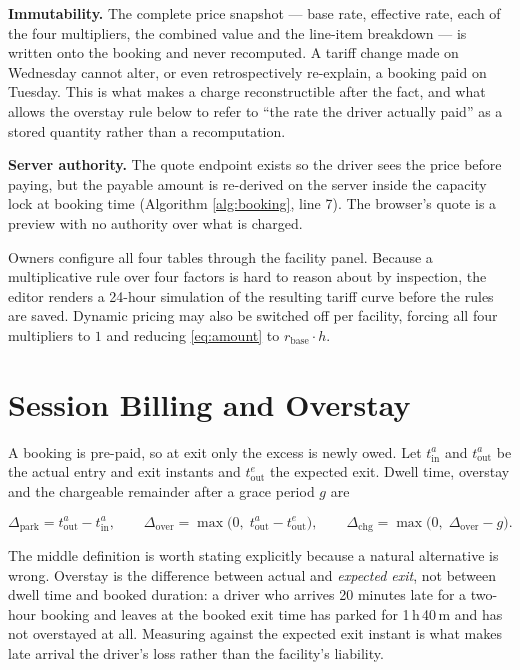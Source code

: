 \documentclass[journal,onecolumn,11pt]{IEEEtran}
\begin{document}
\textbf{Immutability.} The complete price snapshot --- base rate, effective
rate, each of the four multipliers, the combined value and the line-item
breakdown --- is written onto the booking and never recomputed. A tariff change
made on Wednesday cannot alter, or even retrospectively re-explain, a booking
paid on Tuesday. This is what makes a charge reconstructible after the fact,
and what allows the overstay rule below to refer to ``the rate the driver
actually paid'' as a stored quantity rather than a recomputation.

\textbf{Server authority.} The quote endpoint exists so the driver sees the
price before paying, but the payable amount is re-derived on the server inside
the capacity lock at booking time (Algorithm \ref{alg:booking}, line 7). The
browser's quote is a preview with no authority over what is charged.

Owners configure all four tables through the facility panel. Because a
multiplicative rule over four factors is hard to reason about by inspection,
the editor renders a 24-hour simulation of the resulting tariff curve before
the rules are saved. Dynamic pricing may also be switched off per facility,
forcing all four multipliers to $1$ and reducing \eqref{eq:amount} to
$r_{\text{base}} \cdot h$.

\section{Session Billing and Overstay}
\label{sec:billing}

A booking is pre-paid, so at exit only the excess is newly owed. Let
$t_{\text{in}}^{a}$ and $t_{\text{out}}^{a}$ be the actual entry and exit
instants and $t_{\text{out}}^{e}$ the expected exit. Dwell time, overstay and
the chargeable remainder after a grace period $g$ are

\begin{equation}
  \Delta_{\text{park}} = t_{\text{out}}^{a} - t_{\text{in}}^{a},
  \qquad
  \Delta_{\text{over}} = \max\bigl(0,\;
    t_{\text{out}}^{a} - t_{\text{out}}^{e}\bigr),
  \qquad
  \Delta_{\text{chg}}  = \max\bigl(0,\; \Delta_{\text{over}} - g\bigr).
  \label{eq:overstay}
\end{equation}

The middle definition is worth stating explicitly because a natural alternative
is wrong. Overstay is the difference between actual and \emph{expected exit},
not between dwell time and booked duration: a driver who arrives 20 minutes
late for a two-hour booking and leaves at the booked exit time has parked for
1\,h\,40\,m and has not overstayed at all. Measuring against the expected exit
instant is what makes late arrival the driver's loss rather than the facility's
liability.
\end{document}
